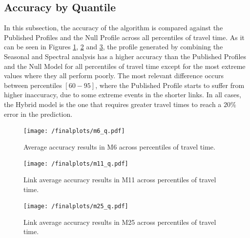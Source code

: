 \documentclass[conference]{IEEEtran}
\begin{document}
\subsection{Accuracy by Quantile}
In this subsection, the accuracy of the algorithm is compared against the Published Profiles and the Null Profile across all percentiles of travel time.
As it can be seen in Figures \ref{fig:m6q}, \ref{fig:m11q} and \ref{fig:m25q}, the profile generated by combining the Seasonal and Spectral analysis has a higher accuracy than the Published Profiles and the Null Model for all percentiles of travel time except for the most extreme values where they all perform poorly. The most relevant difference occurs between percentiles $[60-95]$, where the Published Profile starts to suffer from higher inaccuracy, due to some extreme events in the shorter links. In all cases, the Hybrid model is the one that requires greater travel times to reach a $20\%$ error in the prediction.
\begin{figure}[htbp]
	\centerline{\texttt{[image: /finalplots/m6\_q.pdf]}}
	\caption{Average accuracy results in M6 across percentiles of travel time.}
	\label{fig:m6q}
\end{figure}

\begin{figure}[htbp]
	\centering
	\texttt{[image: /finalplots/m11\_q.pdf]}
	\caption{Link average accuracy results in M11 across percentiles of travel time.}
	\label{fig:m11q}
\end{figure}

\begin{figure}[htbp]
	\centering
	\texttt{[image: /finalplots/m25\_q.pdf]}
	\caption{Link average accuracy results in M25 across percentiles of travel time.}
	\label{fig:m25q}
\end{figure}
\end{document}
